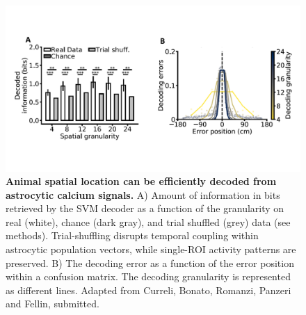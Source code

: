 \begin{figure}[h]
    \centering
    \includegraphics[trim={0 80 0 0}, clip, width=\textwidth]{Figures/Chapter1/intro_fig_seba_3.pdf}
    \caption[Animal spatial location can be efficiently decoded from astrocytic calcium signals]{\textbf{Animal spatial location can be efficiently decoded from astrocytic calcium signals.} 
    A) Amount of information in bits retrieved by the SVM decoder as a function of the granularity on real (white), chance (dark gray), and trial shuffled (grey) data (see methods). Trial-shuffling disrupts temporal coupling within astrocytic population vectors, while single-ROI activity patterns are preserved.
    B) The decoding error as a function of the error position within a confusion matrix. The decoding granularity is represented as different lines.
    Adapted from Curreli, Bonato, Romanzi, Panzeri and Fellin, submitted.} 
    \label{fig:chap1:seba_3}
\end{figure}





